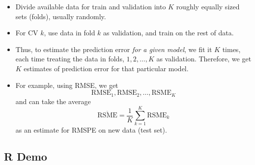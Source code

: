 \begin{itemize}
\begin{figure}[!ht]
            \end{figure}
            \begin{itemize}
                  \item Divide available data for train and validation
                        into $ K $ roughly equally sized sets (folds),
                        usually randomly.
                  \item For CV $ k $, use data in fold $ k $
                        as validation, and train on
                        the rest of data.
                  \item Thus, to estimate the prediction error
                        \emph{for a given model}, we fit it $ K $ times, each
                        time treating the data in folds, $ 1,2,\ldots,K $
                        as validation.
                        Therefore, we get $ K $ estimates of prediction error
                        for that particular model.
                  \item For example, using RMSE, we get
                        \[ \text{RMSE}_1,\text{RMSE}_2,\ldots,\text{RSME}_K \]
                        and can take the average
                        \[ \overline{\text{RSME}}=\frac{1}{K} \sum_{k=1}^{K}\text{RSME}_k \]
                        as an estimate for RMSPE on new data (test set).
            \end{itemize}
\end{itemize}
\subsection{R Demo}

